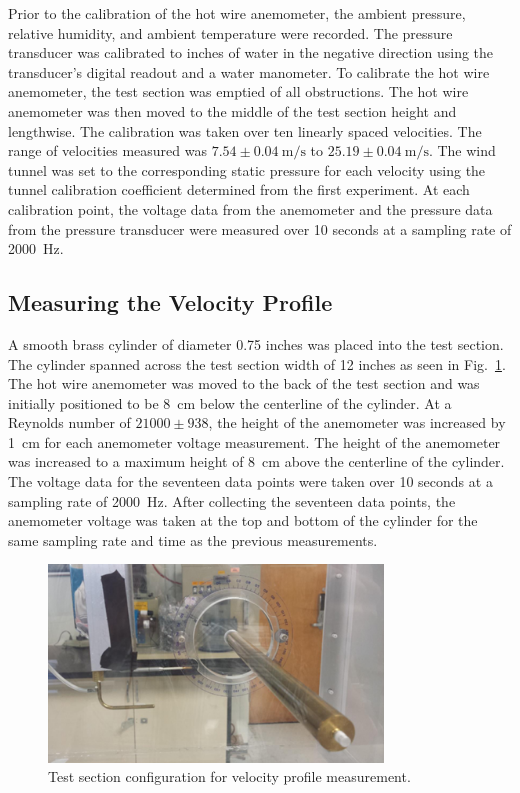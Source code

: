 \documentclass[journal,letterpaper]{IEEEtran}
\begin{document}
Prior to the calibration of the hot wire anemometer, the ambient pressure, relative humidity, and ambient temperature were recorded.
The pressure transducer was calibrated to inches of water in the negative direction using the transducer's digital readout and a water manometer.
To calibrate the hot wire anemometer, the test section was emptied of all obstructions.
The hot wire anemometer was then moved to the middle of the test section height and lengthwise.
The calibration was taken over ten linearly spaced velocities.
The range of velocities measured was $7.54 \pm \qty{0.04}{\m\per\s}$ to $25.19 \pm \qty{0.04}{\m\per\s}$.
The wind tunnel was set to the corresponding static pressure for each velocity using the tunnel calibration coefficient determined from the first experiment.
At each calibration point, the voltage data from the anemometer and the pressure data from the pressure transducer were measured over 10 seconds at a sampling rate of \qty{2000}{\hertz}.

\subsection{Measuring the Velocity Profile}

A smooth brass cylinder of diameter 0.75 inches was placed into the test section.
The cylinder spanned across the test section width of 12 inches as seen in Fig.~\ref{fig:cylinder}.
The hot wire anemometer was moved to the back of the test section and was initially positioned to be \qty{8}{\cm} below the centerline of the cylinder.
At a Reynolds number of $21000 \pm 938$, the height of the anemometer was increased by \qty{1}{\cm} for each anemometer voltage measurement.
The height of the anemometer was increased to a maximum height of \qty{8}{\cm} above the centerline of the cylinder.
The voltage data for the seventeen data points were taken over 10 seconds at a sampling rate of \qty{2000}{\hertz}.
After collecting the seventeen data points, the anemometer voltage was taken at the top and bottom of the cylinder for the same sampling rate and time as the previous measurements.

\begin{figure}[H]
    \centering
    \includegraphics[width=3.5in]{Cylinder}
    \caption{Test section configuration for velocity profile measurement.}
    \label{fig:cylinder}
\end{figure}
\end{document}
